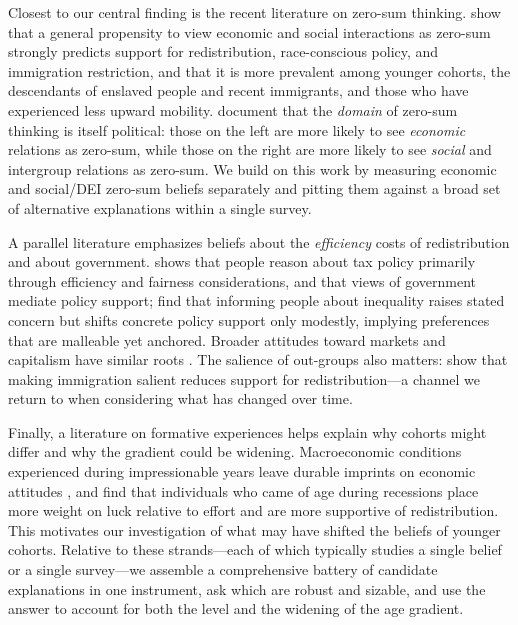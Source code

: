 \documentclass[11pt, headsepline]{article}
\begin{document}
Closest to our central finding is the recent literature on zero-sum thinking. \citet{chinoy2026zero} show that a general propensity to view economic and social interactions as zero-sum strongly predicts support for redistribution, race-conscious policy, and immigration restriction, and that it is more prevalent among younger cohorts, the descendants of enslaved people and recent immigrants, and those who have experienced less upward mobility. \citet{davidai2019politics} document that the \emph{domain} of zero-sum thinking is itself political: those on the left are more likely to see \emph{economic} relations as zero-sum, while those on the right are more likely to see \emph{social} and intergroup relations as zero-sum. We build on this work by measuring economic and social/DEI zero-sum beliefs separately and pitting them against a broad set of alternative explanations within a single survey.

A parallel literature emphasizes beliefs about the \emph{efficiency} costs of redistribution and about government. \citet{stantcheva2021understanding} shows that people reason about tax policy primarily through efficiency and fairness considerations, and that views of government mediate policy support; \citet{kuziemko2015elastic} find that informing people about inequality raises stated concern but shifts concrete policy support only modestly, implying preferences that are malleable yet anchored. Broader attitudes toward markets and capitalism have similar roots \citep{landier2008investigating}. The salience of out-groups also matters: \citet{alesina2023immigration} show that making immigration salient reduces support for redistribution---a channel we return to when considering what has changed over time.

Finally, a literature on formative experiences helps explain why cohorts might differ and why the gradient could be widening. Macroeconomic conditions experienced during impressionable years leave durable imprints on economic attitudes \citep{malmendier2011depression}, and \citet{giuliano2023recessions} find that individuals who came of age during recessions place more weight on luck relative to effort and are more supportive of redistribution. This motivates our investigation of what may have shifted the beliefs of younger cohorts. Relative to these strands---each of which typically studies a single belief or a single survey---we assemble a comprehensive battery of candidate explanations in one instrument, ask which are robust and sizable, and use the answer to account for both the level and the widening of the age gradient.
\end{document}
